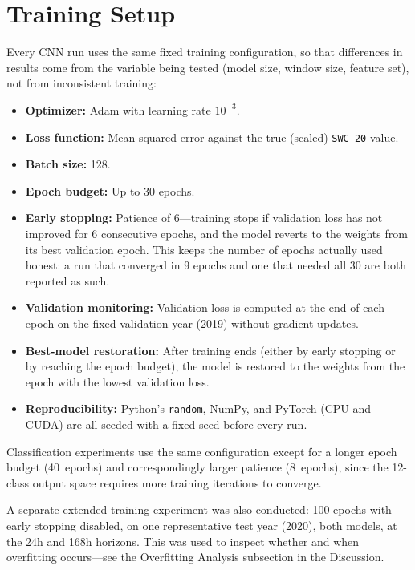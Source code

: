 \documentclass[11pt]{article}
\begin{document}
\section{Training Setup}

Every CNN run uses the same fixed training configuration, so that differences in
results come from the variable being tested (model size, window size, feature set),
not from inconsistent training:

\begin{itemize}
    \item \textbf{Optimizer:} Adam \cite{kingma2015adam} with learning rate $10^{-3}$.
    \item \textbf{Loss function:} Mean squared error against the true (scaled)
    \texttt{SWC\_20} value.
    \item \textbf{Batch size:} 128.
    \item \textbf{Epoch budget:} Up to 30 epochs.
    \item \textbf{Early stopping:} Patience of 6---training stops if validation loss
    has not improved for 6 consecutive epochs, and the model reverts to the weights
    from its best validation epoch. This keeps the number of epochs actually used
    honest: a run that converged in 9 epochs and one that needed all 30 are both
    reported as such.
    \item \textbf{Validation monitoring:} Validation loss is computed at the end of
    each epoch on the fixed validation year (2019) without gradient updates.
    \item \textbf{Best-model restoration:} After training ends (either by early
    stopping or by reaching the epoch budget), the model is restored to the weights
    from the epoch with the lowest validation loss.
    \item \textbf{Reproducibility:} Python's \texttt{random}, NumPy, and PyTorch (CPU
    and CUDA) are all seeded with a fixed seed before every run.
\end{itemize}
Classification experiments use the same configuration except for a longer epoch
budget (40~epochs) and correspondingly larger patience (8~epochs), since the
12-class output space requires more training iterations to converge.

A separate extended-training experiment was also conducted: 100 epochs with early
stopping disabled, on one representative test year (2020), both models, at the 24h
and 168h horizons. This was used to inspect whether and when overfitting occurs---see
the Overfitting Analysis subsection in the Discussion.
\end{document}
